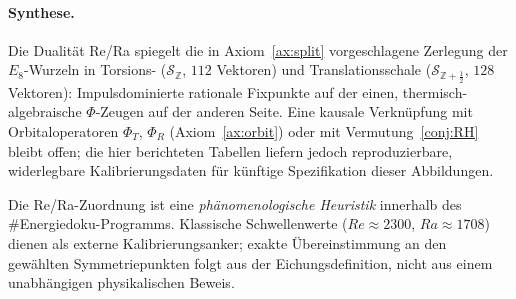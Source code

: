 \paragraph{Synthese.}
Die Dualität Re/Ra spiegelt die in Axiom~\ref{ax:split} vorgeschlagene Zerlegung der $E_8$-Wurzeln in Torsions- ($\mathcal{S}_{\mathbb{Z}}$, $112$ Vektoren) und Translationsschale ($\mathcal{S}_{\mathbb{Z}+\frac12}$, $128$ Vektoren): Impulsdominierte rationale Fixpunkte auf der einen, thermisch-algebraische $\Phi$-Zeugen auf der anderen Seite. Eine kausale Verknüpfung mit Orbitaloperatoren $\Phi_T$, $\Phi_R$ (Axiom~\ref{ax:orbit}) oder mit Vermutung~\ref{conj:RH} bleibt offen; die hier berichteten Tabellen liefern jedoch reproduzierbare, widerlegbare Kalibrierungsdaten für künftige Spezifikation dieser Abbildungen.

\begin{remark}
Die Re/Ra-Zuordnung ist eine \emph{phänomenologische Heuristik} innerhalb des \#Energiedoku-Programms. Klassische Schwellenwerte ($Re\approx 2300$, $Ra\approx 1708$) dienen als externe Kalibrierungsanker; exakte Übereinstimmung an den gewählten Symmetriepunkten folgt aus der Eichungsdefinition, nicht aus einem unabhängigen physikalischen Beweis.
\end{remark}

